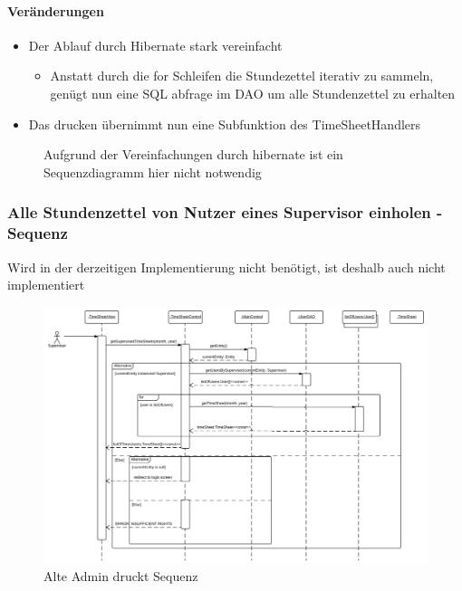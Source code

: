     \paragraph{Veränderungen}
    \begin{itemize}
        \item Der Ablauf durch Hibernate stark vereinfacht
        \begin{itemize}
            \item Anstatt durch die for Schleifen die Stundezettel iterativ zu sammeln, genügt nun eine SQL abfrage im DAO um alle Stundenzettel zu erhalten
        \end{itemize}
        \item Das drucken übernimmt nun eine Subfunktion des TimeSheetHandlers
    \end{itemize}

    \begin{figure}[H]
      \centering
       \caption{Aufgrund der Vereinfachungen durch hibernate ist ein Sequenzdiagramm hier nicht notwendig}
    \end{figure}


    \newpage
    \subsubsection{Alle Stundenzettel von Nutzer eines Supervisor einholen - Sequenz}

        Wird in der derzeitigen Implementierung nicht benötigt, ist deshalb auch nicht implementiert
        \begin{figure}[H]
          \centering
            \includegraphics[scale=0.1]{Get-timesheets-of-all-supervised-users.pdf}
           \caption{Alte Admin druckt Sequenz}
        \end{figure}

